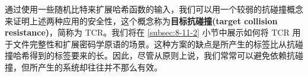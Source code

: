 \begin{snote}[不依赖抗碰撞的安全性。]
通过使用一些随机比特来扩展哈希函数的输入，我们可以用一个较弱的抗碰撞概念来证明上述两种应用的安全性，这个概念称为\textbf{目标抗碰撞(target collision resistance)}，简称为 TCR。我们将在 \ref{subsec:8-11-2} 小节中展示如何将 TCR 用于文件完整性和扩展密码学原语的场景。这种方案的缺点是所产生的标签比从抗碰撞哈希得到的标签要来的长。因此，尽管从原则上说，我们常常可以避免依赖抗碰撞，但所产生的系统却往往并不那么有效。
\end{snote}














